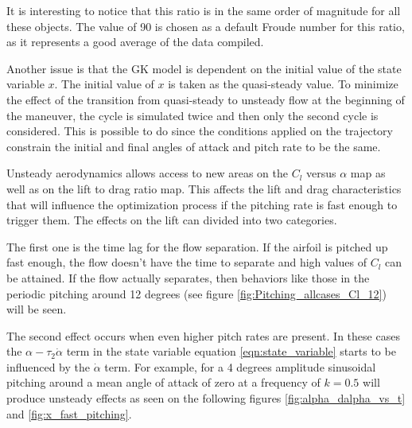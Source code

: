 \par It is interesting to notice that this ratio is in the same order of magnitude for all these objects.
The value of 90 is chosen as a default Froude number for this ratio, as it represents a good average of the data compiled.

\par Another issue is that the GK model is dependent on the initial value of the state variable $x$.
The initial value of $x$ is taken as the quasi-steady value.
To minimize the effect of the transition from quasi-steady to unsteady flow at the beginning of the maneuver, the cycle is simulated twice and then only the second cycle is considered.
This is possible to do since the conditions applied on the trajectory constrain the initial and final angles of attack and pitch rate to be the same.

 \label{sub:unsteady_effects}
Unsteady aerodynamics allows access to new areas on the $C_l$ versus $\alpha$ map as well as on the lift to drag ratio map.
This affects the lift and drag characteristics that will influence the optimization process if the pitching rate is fast enough to trigger them.
The effects on the lift can divided into two categories.

\par The first one is the time lag for the flow separation. 
If the airfoil is pitched up fast enough, the flow doesn't have the time to separate and high values of $C_l$ can be attained.
If the flow actually separates, then behaviors like those in the periodic pitching around 12 degrees (see figure \ref{fig:Pitching_allcases_Cl_12}) will be seen.

\par The second effect occurs when even higher pitch rates are present.
In these cases the $\alpha - \tau_2 \dot{\alpha}$ term in the state variable equation \ref{eqn:state_variable} starts to be influenced by the $\dot{\alpha}$ term. 
For example, for a 4 degrees amplitude sinusoidal pitching around a mean angle of attack of zero at a frequency of $k=0.5$ will produce unsteady effects as seen on the following figures \ref{fig:alpha_dalpha_vs_t} and \ref{fig:x_fast_pitching}.

